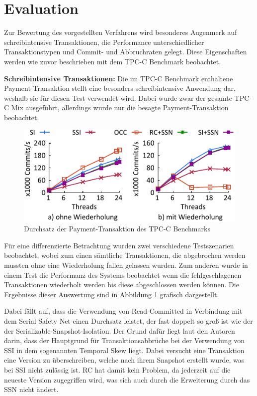 \section{Evaluation}
\label{sec:evaluation}

Zur Bewertung des vorgestellten Verfahrens wird besonderes Augenmerk auf schreibintensive Transaktionen, die Performance unterschiedlicher Transaktionstypen und Commit- und Abbruchraten gelegt.
Diese Eigenschaften werden wie zuvor beschrieben mit dem TPC-C Benchmark beobachtet.

\textbf{Schreibintensive Transaktionen:} Die im TPC-C Benchmark enthaltene Payment-Transaktion stellt eine besonders schreibintensive Anwendung dar, weshalb sie für diesen Test verwendet wird.
Dabei wurde zwar der gesamte TPC-C Mix ausgeführt, allerdings wurde nur die besagte Payment-Transaktion beobachtet.

\begin{figure}
	\includegraphics[width=\columnwidth]{img/Figure_3.pdf}
	\caption{Durchsatz der Payment-Transaktion des TPC-C Benchmarks}
	\label{fig:payment}
\end{figure}

Für eine differenzierte Betrachtung wurden zwei verschiedene Testszenarien beobachtet, wobei zum einen sämtliche Transaktionen, die abgebrochen werden mussten ohne eine Wiederholung fallen gelassen wurden.
Zum anderen wurde in einem Test die Performanz des Systems beobachtet wenn die fehlgeschlagenen Transaktionen wiederholt werden bis diese abgeschlossen werden können.
Die Ergebnisse dieser Auswertung sind in Abbildung \ref{fig:payment} grafisch dargestellt.

Dabei fällt auf, dass die Verwendung von Read-Committed in Verbindung mit dem Serial Safety Net einen Durchsatz leistet, der fast doppelt so groß ist wie der der Serializable-Snapshot-Isolation.
Der Grund dafür liegt laut den Autoren darin, dass der Hauptgrund für Transaktionsabbrüche bei der Verwendung von SSI in dem sogenannten Temporal Skew liegt.
Dabei versucht eine Transaktion eine Version zu überschreiben, welche nach ihrem Snapshot erstellt wurde, was bei SSI nicht zulässig ist.
RC hat damit kein Problem, da jederzeit auf die neueste Version zugegriffen wird, was sich auch durch die Erweiterung durch das SSN nicht ändert.

